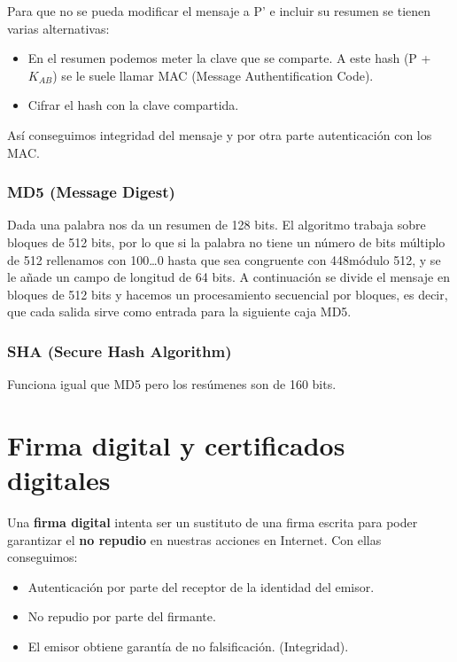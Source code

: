 Para que no se pueda modificar el mensaje a P' e incluir su resumen se tienen varias alternativas: 
\begin{itemize}
    \item En el resumen podemos meter la clave que se comparte. A este hash (P + $K_{AB}$) se le suele llamar MAC (Message Authentification Code).
    \item Cifrar el hash con la clave compartida.
\end{itemize}

Así conseguimos integridad del mensaje y por otra parte autenticación con los MAC\@.

\subsubsection{MD5 (Message Digest)}

Dada una palabra nos da un resumen de 128 bits. El algoritmo trabaja sobre bloques de 512 bits, por lo que si la palabra no tiene un número de bits múltiplo de 512 rellenamos con 100\ldots0 hasta que sea congruente con 448módulo 512, y se le añade un campo de longitud de 64 bits. A continuación se divide el mensaje en bloques de 512 bits y hacemos un procesamiento secuencial por bloques, es decir, que cada salida sirve como entrada para la siguiente caja MD5\@.


\subsubsection{SHA (Secure Hash Algorithm)}

Funciona igual que MD5 pero los resúmenes son de 160 bits. 


\section{Firma digital y certificados digitales}

Una \textbf{firma digital} intenta ser un sustituto de una firma escrita para poder garantizar el \textbf{no repudio} en nuestras acciones en Internet. Con ellas conseguimos:
\begin{itemize}
    \item Autenticación por parte del receptor de la identidad del emisor.
    \item No repudio por parte del firmante.
    \item El emisor obtiene garantía de no falsificación. (Integridad).
\end{itemize}

